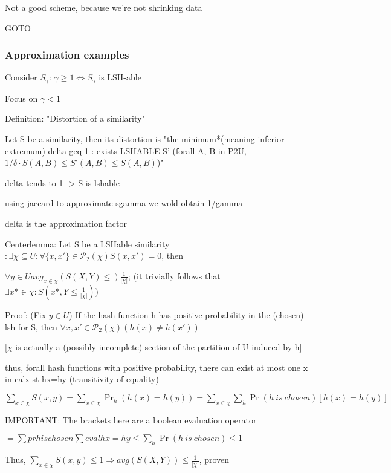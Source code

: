 \documentclass{report}
\begin{document}
	Not a good scheme, because we're not shrinking data
	
	GOTO %
	
	\subsubsection{Approximation examples}
	
	Consider $S_\gamma$: $\gamma \geq 1 \Leftrightarrow S_\gamma$ is LSH-able
	
	Focus on $\gamma < 1$
	
	Definition: "Distortion of a similarity"
	
	Let S be a similarity, then its distortion is "the minimum*(meaning inferior extremum) delta geq 1 : exists LSHABLE S' (forall {A, B} in P2U, $1/\delta \cdot S(A, B) \leq S'(A, B) \leq S(A, B)$)"
	
	delta tends to 1 -> S is lshable
	
	using jaccard to approximate sgamma we wold obtain 1/gamma
	
	delta is the approximation factor
	
	
	Centerlemma: Let S be a LSHable similarity $ : \exists \chi \subseteq U : \forall \{x, x'\} \in \mathcal{P}_2(\chi) S(x, x')=0$, then
	
	$\forall y \in U avg_{x \in \chi}(S(X, Y) \leq) \frac{1}{|\chi|}$; (it trivially follows that $\exists x* \in \chi : S(x*, Y \leq \frac{1}{|\chi|})$)
	
	Proof: (Fix $y \in U$) If the hash function h has positive probability in the (chosen) lsh for S, then $\forall {x, x'} \in \mathcal{P}_2(\chi) (h(x)\neq h(x'))$
	
	[$\chi$ is actually a (possibly incomplete) section of the partition of U induced by h]
	
	thus, forall hash functions with positive probability, there can exist at most one x in calx st hx=hy (transitivity of equality)
	
	$\sum_{x \in \chi}S(x, y) = \sum_{x \in \chi}\Pr_h(h(x)=h(y)) = \sum_{x \in \chi}\sum_{h}\Pr(h\ is\ chosen)[h(x)=h(y)]$
	
	IMPORTANT: The brackets here are a boolean evaluation operator
	
	$= \sum pr h is chosen \sum eval hx = hy \leq \sum_h \Pr(h\ is\ chosen) \leq 1$
	
	Thus, $\sum_{x \in \chi}S(x, y) \leq 1 \Rightarrow avg(S(X, Y)) \leq \frac{1}{|\chi|}$, proven
	
\end{document}
